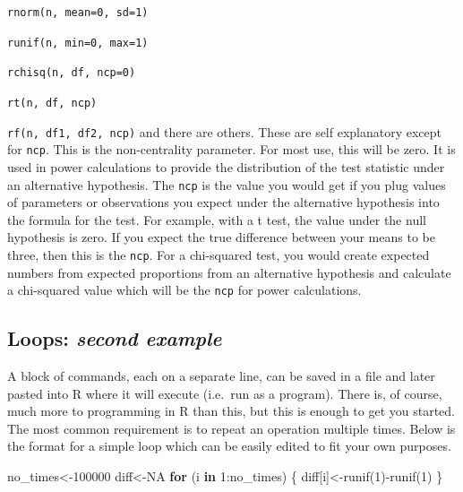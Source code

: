 \documentclass[
]{book}
\newenvironment{Shaded}{\begin{snugshade}}{\end{snugshade}}
\newcommand{\ConstantTok}[1]{\textcolor[rgb]{0.00,0.00,0.00}{#1}}
\newcommand{\ControlFlowTok}[1]{\textcolor[rgb]{0.13,0.29,0.53}{\textbf{#1}}}
\newcommand{\DecValTok}[1]{\textcolor[rgb]{0.00,0.00,0.81}{#1}}
\newcommand{\FunctionTok}[1]{\textcolor[rgb]{0.00,0.00,0.00}{#1}}
\newcommand{\NormalTok}[1]{#1}
\newcommand{\OtherTok}[1]{\textcolor[rgb]{0.56,0.35,0.01}{#1}}
\newcommand{\SpecialCharTok}[1]{\textcolor[rgb]{0.00,0.00,0.00}{#1}}
\begin{document}
\texttt{rnorm(n,\ mean=0,\ sd=1)}

\texttt{runif(n,\ min=0,\ max=1)}

\texttt{rchisq(n,\ df,\ ncp=0)}

\texttt{rt(n,\ df,\ ncp)}

\texttt{rf(n,\ df1,\ df2,\ ncp)}
and there are others. These are self explanatory except for \texttt{ncp}. This is the non-centrality parameter. For most use, this will be zero. It is used in power calculations to provide the distribution of the test statistic under an alternative hypothesis. The \texttt{ncp} is the value you would get if you plug values of parameters or observations you expect under the alternative hypothesis into the formula for the test. For example, with a t test, the value under the null hypothesis is zero. If you expect the true difference between your means to be three, then this is the \texttt{ncp}. For a chi-squared test, you would create expected numbers from expected proportions from an alternative hypothesis and calculate a chi-squared value which will be the \texttt{ncp} for power calculations.

\hypertarget{loops-second-example}{%
\subsection{\texorpdfstring{Loops: \emph{second example}}{Loops: second example}}\label{loops-second-example}}

A block of commands, each on a separate line, can be saved in a file and later pasted into R where it will execute (i.e.~run as a program). There is, of course, much more to programming in R than this, but this is enough to get you started. The most common requirement is to repeat an operation multiple times. Below is the format for a simple loop which can be easily edited to fit your own purposes.

\begin{Shaded}
\begin{Highlighting}[]
\NormalTok{no\_times}\OtherTok{\textless{}{-}}\DecValTok{100000}
\NormalTok{diff}\OtherTok{\textless{}{-}}\ConstantTok{NA}
\ControlFlowTok{for}\NormalTok{ (i }\ControlFlowTok{in} \DecValTok{1}\SpecialCharTok{:}\NormalTok{no\_times) \{}
\NormalTok{diff[i]}\OtherTok{\textless{}{-}}\FunctionTok{runif}\NormalTok{(}\DecValTok{1}\NormalTok{)}\SpecialCharTok{{-}}\FunctionTok{runif}\NormalTok{(}\DecValTok{1}\NormalTok{)}
\NormalTok{\}}
\end{Highlighting}
\end{Shaded}
\end{document}
